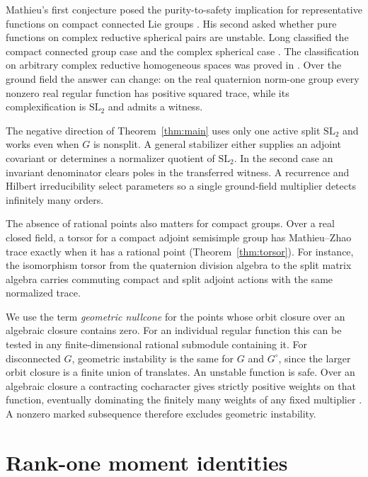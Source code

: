 \documentclass[11pt]{article}
\newcommand{\SL}{\mathrm{SL}}
\begin{document}
Mathieu's first conjecture posed the purity-to-safety implication for
representative functions on compact connected Lie groups \cite{Mathieu}.
His second asked whether pure functions on complex reductive spherical
pairs are unstable. Long classified the compact connected group case
and the complex spherical case \cite{Long,LongSpherical}.
The classification on arbitrary complex reductive homogeneous spaces
was proved in \cite{Complex}. Over the ground field the answer can change:
on the real quaternion norm-one group every nonzero real regular
function has positive squared trace, while its complexification is
\(\SL_2\) and admits a witness.

The negative direction of Theorem~\ref{thm:main} uses only one active
split \(\SL_2\) and works even when \(G\) is nonsplit. A general
stabilizer either supplies an adjoint covariant or determines a
normalizer quotient of \(\SL_2\). In the second case an invariant
denominator clears poles in the transferred witness. A recurrence
and Hilbert irreducibility select parameters so a single ground-field
multiplier detects infinitely many orders.

The absence of rational points also matters for compact groups.
Over a real closed field, a torsor for a compact adjoint semisimple
group has Mathieu--Zhao trace exactly when it has a rational point
(Theorem~\ref{thm:torsor}). For instance, the isomorphism torsor from
the quaternion division algebra to the split matrix algebra carries
commuting compact and split adjoint actions with the same normalized
trace.

We use the term \emph{geometric nullcone} for the points whose orbit
closure over an algebraic closure contains zero. For an individual
regular function this can be tested in any finite-dimensional rational
submodule containing it. For disconnected \(G\), geometric instability
is the same for \(G\) and \(G^\circ\), since the larger orbit closure is
a finite union of translates. An unstable function is safe. Over an
algebraic closure a contracting cocharacter gives strictly positive
weights on that function, eventually dominating the finitely many
weights of any fixed multiplier \cite{Kempf,LongSpherical}.
A nonzero marked subsequence therefore excludes geometric instability.

\section{Rank-one moment identities}\label{sec:rank}
\end{document}
